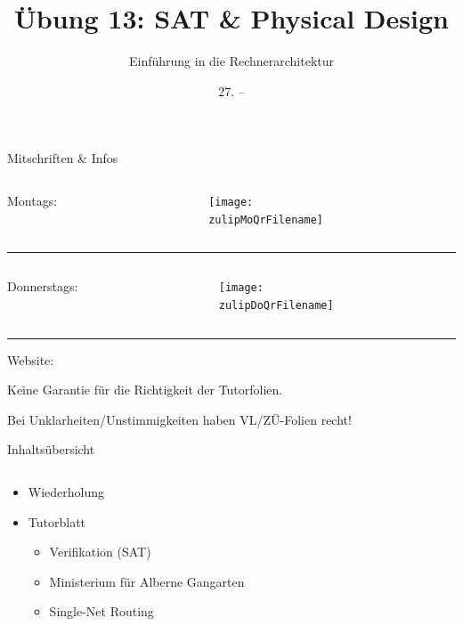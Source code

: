 \documentclass[
  german,            %
  aspectratio=169,    %
]{tumbeamer}
\title{Übung 13: SAT \& Physical Design}
\subtitle{Einführung in die Rechnerarchitektur}
\author{\theAuthorName}
\institute{\theGroupName\\\theSchoolName\\\theUniversityName}
\date{27. -- \DTMdisplaydate{2025}{01}{31}{-1}}
\begin{document}
\maketitle

\begin{frame}[c]{Mitschriften \& Infos}{}
  \begin{minipage}[t]{\textwidth}
    \begin{columns}[c]
      \begin{column}{0.8\textwidth}
        Montags: \href{\zulipMo}{\zulipMo}
      \end{column}
      \begin{column}{0.2\textwidth}
        \texttt{[image: \\zulipMoQrFilename]}
      \end{column}
    \end{columns}
  \end{minipage}
  \rule{\textwidth}{0.4pt}
  \begin{minipage}[t]{\textwidth}
    \begin{columns}[c]
      \begin{column}{0.8\textwidth}
        Donnerstags: \href{\zulipDo}{\zulipDo}
      \end{column}
      \begin{column}{0.2\textwidth}
        \texttt{[image: \\zulipDoQrFilename]}
      \end{column}
    \end{columns}
  \end{minipage}
  \ifdefined\myWebsite
  \rule{\textwidth}{0.4pt}
  \centering
  Website: \href{\myWebsite}{\myWebsite}
  \fi
\end{frame}

\begin{frame}[c]{}{}
  \begin{center}
    \LARGE  Keine Garantie für die Richtigkeit der Tutorfolien.

    \Large Bei Unklarheiten/Unstimmigkeiten haben VL/ZÜ-Folien recht!
  \end{center}
\end{frame}

\begin{frame}[c]{Inhaltsübersicht}{}
  \begin{columns}[c]
    \begin{column}{1\textwidth}
      \begin{itemize}
        \item Wiederholung
        \item Tutorblatt
        \begin{itemize}
			\item Verifikation (SAT)
			\item Ministerium für Alberne Gangarten
			\item Single-Net Routing
        \end{itemize}
      \end{itemize}
    \end{column}
  \end{columns}
\end{frame}
\end{document}
